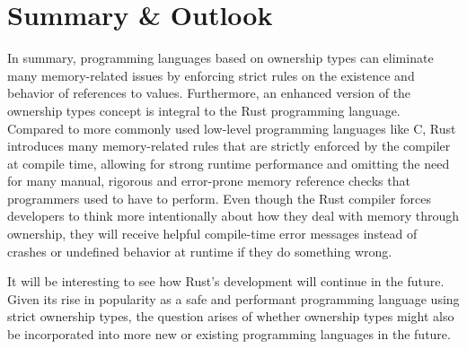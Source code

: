 \documentclass[sigplan,11pt,nonacm]{acmart}
\begin{document}








\section{Summary \& Outlook}
\label{sec:summary}

In summary, programming languages based on ownership types can eliminate many memory-related issues by enforcing strict rules on the existence and behavior of references to values.
Furthermore, an enhanced version of the ownership types concept is integral to the Rust programming language.
Compared to more commonly used low-level programming languages like C, Rust introduces many memory-related rules that are strictly enforced by the compiler at compile time, allowing for strong runtime performance and omitting the need for many manual, rigorous and error-prone memory reference checks that programmers used to have to perform.
Even though the Rust compiler forces developers to think more intentionally about how they deal with memory through ownership, they will receive helpful compile-time error messages instead of crashes or undefined behavior at runtime if they do something wrong.

It will be interesting to see how Rust's development will continue in the future.
Given its rise in popularity as a safe and performant programming language using strict ownership types, the question arises of whether ownership types might also be incorporated into more new or existing programming languages in the future.



\end{document}
